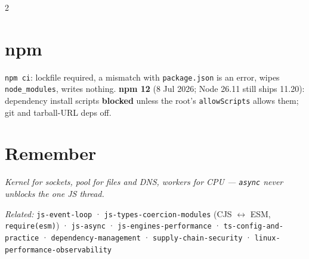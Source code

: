 \documentclass[8pt]{extarticle}
\newcommand\ct[1]{\texttt{#1}}
\begin{document}
\begin{multicols}{2}
\section{npm}
\ct{npm ci}: lockfile required, a mismatch with \ct{package.json} is an error, wipes
\ct{node\_modules}, writes nothing. \textbf{npm 12} (8 Jul 2026; Node 26.11 still ships 11.20):
dependency install scripts \textbf{blocked} unless the root's \ct{allowScripts} allows them;
git and tarball-URL deps off.

\section{Remember}
\emph{Kernel for sockets, pool for files and DNS, workers for CPU — \ct{async} never unblocks
the one JS thread.}

\end{multicols}

{\footnotesize\color{sheetGrey}\raggedright\noindent\textit{Related:} \texttt{js-event-loop} ·
\texttt{js-types-coercion-modules} (CJS $\leftrightarrow$ ESM, \texttt{require(esm)}) ·
\texttt{js-async} · \texttt{js-engines-performance} · \texttt{ts-config-and-practice} ·
\texttt{dependency-management} · \texttt{supply-chain-security} ·
\texttt{linux-performance-observability}\par}
\end{document}
